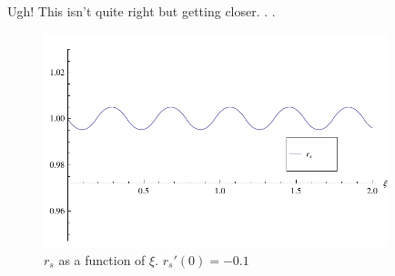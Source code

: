 \documentclass[aps,prl,preprint,groupedaddress]{revtex4-1}
\begin{document}
Ugh! This isn't quite right but getting closer. . .

\begin{figure}[htb]\label{fig:diffuck}
  \centering
    \includegraphics[width=100mm]{./figures/diffeq.pdf}
      \caption{$r_s$ as a function of $\xi$. $r_s'(0) = -0.1$}
\end{figure}









\end{document}

